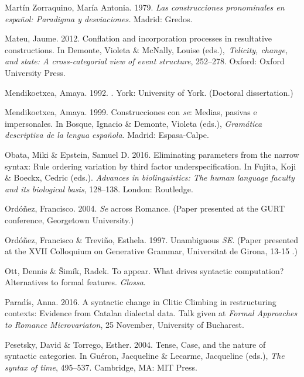 \documentclass[output=paper]{langsci/langscibook}
\begin{document}
\begin{styleTextbodyindent}
Martín Zorraquino, María Antonia. 1979. \textit{Las construcciones pronominales en español: Paradigma y desviaciones.} Madrid: Gredos.
\end{styleTextbodyindent}

\begin{styleTextbodyindent}
Mateu, Jaume. 2012. Conflation and incorporation processes in resultative constructions. In Demonte, Violeta \& McNally, Louise (eds.),~\textit{Telicity, change, and state: A cross-categorial view of event structure}, 252–278. Oxford: Oxford University Press.
\end{styleTextbodyindent}

Mendikoetxea, Amaya. 1992.  . York: University of York. (Doctoral dissertation.)

Mendikoetxea, Amaya. 1999. Construcciones con \textit{se}: Medias, pasivas e impersonales. In Bosque, Ignacio \& Demonte, Violeta (eds.), \textit{Gramática descriptiva de la lengua española}. Madrid: Espasa-Calpe.

Obata, Miki \& Epstein, Samuel D. 2016. Eliminating parameters from the narrow syntax: Rule ordering variation by third factor underspecification. In Fujita, Koji \& Boeckx, Cedric (eds.). \textit{Advances in biolinguistics: The human language faculty and its biological basis}, 128–138. London: Routledge.

Ordóñez, Francisco. 2004. \textit{Se} across Romance. (Paper presented at the GURT conference, Georgetown University.)

Ordóñez, Francisco \& Treviño, Esthela. 1997. Unambiguous \textit{SE}. (Paper presented at the XVII Colloquium on Generative Grammar, Universitat de Girona, 13-15 \citealt{June2007}.)

Ott, Dennis \& Šimík, Radek. To appear. What drives syntactic computation? Alternatives to formal features. \textit{Glossa}.

Paradís, Anna. 2016. A syntactic change in Clitic Climbing in restructuring contexts: Evidence from Catalan dialectal data. Talk given at \textit{Formal Approaches to Romance Microvariaton}, 25 November, University of Bucharest. 

Pesetsky, David \& Torrego, Esther. 2004. Tense, Case, and the nature of syntactic categories. In Guéron, Jacqueline \& Lecarme, Jacqueline (eds.), \textit{The syntax of time}, 495–537. Cambridge, MA: MIT Press.
\end{document}
